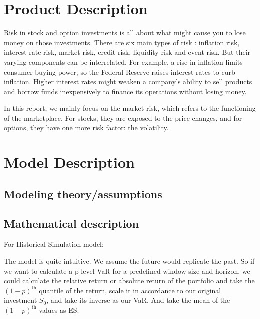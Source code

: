 \documentclass[letterpaper,11pt, oneside]{layout}
\begin{document}
\begingroup
\renewcommand{\clearpage}{}
\chapter{Product Description}
\label{chap:pd}
\endgroup

Risk in stock and option investments is all about what might cause you to lose money on those investments. There are six main types of risk  \cite{web:rfs}: inflation risk, interest rate risk, market risk, credit risk, liquidity risk and event risk. But their varying components can be interrelated. For example, a rise in inflation limits consumer buying power, so the Federal Reserve raises interest rates to curb inflation. Higher interest rates might weaken a company's ability to sell products and borrow funds inexpensively to finance its operations without losing money. 

In this report, we mainly focus on the market risk, which refers to the functioning of the marketplace. For stocks, they are exposed to the price changes, and for options, they have one more risk factor: the volatility.



\begingroup
\renewcommand{\clearpage}{}
\chapter{Model Description}
\label{chap:md}
\endgroup

\section{Modeling theory/assumptions}
\label{sec:md:mt}

\section{Mathematical description}
\label{sec:md:md}

For Historical Simulation model: 

The model is quite intuitive. We assume the future would replicate the past. So if we want to calculate a p level VaR for a predefined window size and horizon, we could calculate the relative return or absolute return of the portfolio and take the $(1-p)^{\text{th}}$ quantile of the return, scale it in accordance to our original investment $S_0$, and take its inverse as our VaR. And take the mean of the $(1-p)^{\text{th}}$ values as ES.
\end{document}
